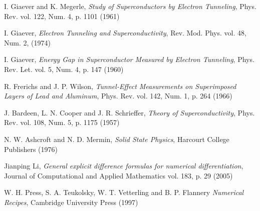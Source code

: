 \documentclass[twocolumn, twoside,a4paper,10pt]{article}
\begin{document}
\begin{thebibliography}{99}

 I. Giaever and K. Megerle, \emph{Study of Superconductors by Electron Tunneling}, Phys. Rev. vol. 122, Num. 4, p. 1101 (1961)

 I. Giaever, \emph{Electron Tunneling and Superconductivity}, Rev. Mod. Phys. vol. 48, Num. 2, (1974)

 I. Giaever, \emph{Energy Gap in Superconductor Measured by Electron Tunneling}, Phys. Rev. Let. vol. 5, Num. 4, p. 147 (1960)

 R. Frerichs and J. P. Wilson, \emph{Tunnel-Effect Measurements on Superimposed Layers of Lead and Aluminum}, Phys. Rev. vol. 142, Num. 1, p. 264 (1966)

 J. Bardeen, L. N. Cooper and J. R. Schrieffer, \emph{Theory of Superconductivity}, Phys. Rev. vol. 108, Num. 5, p. 1175 (1957)

 N. W. Ashcroft and N. D. Mermin, \emph{Solid State Physics}, Harcourt College Publishers (1976)

 Jianping Li, \emph{General explicit difference formulas for numerical differentiation}, Journal of Computational and Applied Mathematics vol. 183, p. 29 (2005)

 W. H. Press, S. A. Teukolsky, W. T. Vetterling and B. P. Flannery \emph{Numerical Recipes},  Cambridge University Press (1997)



\end{thebibliography}

\end{document}
